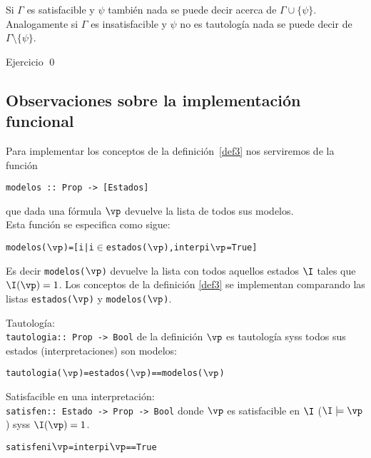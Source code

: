 \documentclass[11pt,letterpaper]{article}
\begin{document}
\espc

Si $\Gamma$ es satisfacible y $\psi$ tambi\'en nada se puede decir acerca de
$\Gamma\cup\{\psi\}$. Analogamente si $\Gamma$ es insatisfacible y $\psi$ no es
tautolog\'ia nada se puede decir de $\Gamma\setminus\{\psi\}$.

\espc

\proof
Ejercicio
\qed

\espc
\subsection{Observaciones sobre la implementaci\'on funcional}

\noindent Para implementar los conceptos de la definici\'on~\ref{def3} nos 
serviremos de la funci\'on 
\begin{verbatim}
modelos :: Prop -> [Estados]                 
\end{verbatim}
que dada una f\'ormula $\vp$ devuelve la lista de todos sus modelos. \\
Esta funci\'on se especifica como sigue:
\begin{alltt}
modelos(\(\vp\)) = [i | i \(\in\) estados(\(\vp\)),\;interp\;i\;\(\vp\) = True]
\end{alltt}
Es decir \verb=modelos(=$\vp$\verb=)= devuelve la lista 
con todos aquellos estados $\I$ tales que $\I(\vp)=1$.
Los conceptos de la definici\'on \ref{def3} se implementan comparando las 
listas \verb=estados(=$\vp$\verb=)=  y \verb=modelos(=$\vp$\verb=)=.

\bi
\item Tautolog\'ia: \\
\verb=tautologia:: Prop -> Bool= de la definici\'on $\vp$ es tautolog\'ia syss 
todos sus estados (interpretaciones) son modelos:
\begin{alltt} 
 tautologia(\(\vp\)) = estados(\(\vp\)) == modelos(\(\vp\))
\end{alltt}

\item Satisfacible en una interpretaci\'on: \\
\verb=satisfen:: Estado -> Prop -> Bool= donde $\vp$ es satisfacible en $\I$ 
($\I\models\vp$) syss $\I(\vp)=1$. 
\begin{alltt}
satisfen i \(\vp\) = interp i \(\vp\) == True 
\end{alltt}
\end{document}
